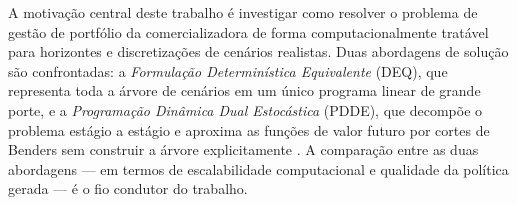 A motivação central deste trabalho é investigar como resolver o problema de gestão de portfólio da comercializadora de forma computacionalmente tratável para horizontes e discretizações de cenários realistas. Duas abordagens de solução são confrontadas: a \emph{Formulação Determinística Equivalente} (DEQ), que representa toda a árvore de cenários em um único programa linear de grande porte, e a \emph{Programação Dinâmica Dual Estocástica} (PDDE), que decompõe o problema estágio a estágio e aproxima as funções de valor futuro por cortes de Benders sem construir a árvore explicitamente \cite{pereira1991}. A comparação entre as duas abordagens --- em termos de escalabilidade computacional e qualidade da política gerada --- é o fio condutor do trabalho.
